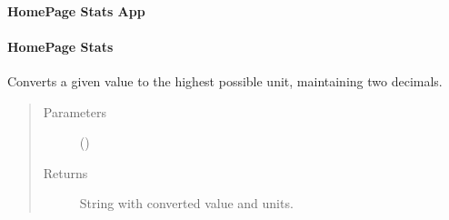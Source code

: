 \documentclass[letterpaper,10pt,english]{sphinxmanual}
\begin{document}
\paragraph{HomePage Stats App}
\label{\detokenize{_autosummary/report_manager.apps:homepage-stats-app}}

\paragraph{HomePage Stats}
\label{\detokenize{_autosummary/report_manager.apps:module-report_manager.apps.homepageStats}}\label{\detokenize{_autosummary/report_manager.apps:homepage-stats}}

\begin{fulllineitems}
\label{\detokenize{_autosummary/report_manager.apps:report_manager.apps.homepageStats.size_converter}}
Converts a given value to the highest possible unit, maintaining two decimals.
\begin{quote}\begin{description}
\item[{Parameters}] \leavevmode
{} () \textendash{} 

\item[{Returns}] \leavevmode
String with converted value and units.

\end{description}\end{quote}

\end{fulllineitems}

\end{document}
